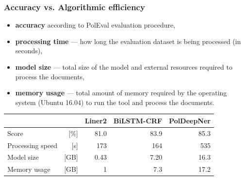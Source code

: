 \documentclass[Warsaw]{beamer}
\begin{document}

\begin{frame}
    \frametitle{Accuracy vs. Algorithmic efficiency}
    \begin{itemize}
        \item \textbf{accuracy} according to PolEval evaluation procedure, 
        \item \textbf{processing time} --- how long the evaluation dataset is being processed (in seconds), 
        \item \textbf{model size} --- total size of the model and external resources required to process the documents,
        \item \textbf{memory usage} --- total amount of memory required by the operating system (Ubuntu 16.04) to run the tool and process the documents.
    \end{itemize}
    
\begin{table}[ht]
\tiny
    \centering
    \bgroup
    \def\arraystretch{1.2}%
    \begin{tabular}{lr|r|r|r}
                         &     &  \textbf{Liner2} & \textbf{BiLSTM-CRF} & \textbf{PolDeepNer} \\
        \hline
        \hline
        Score                  & [\%] &  81.0   &  83.9 & 85.3 \\
        \hline
        Processing speed       & [s]  &  173    &  164  & 535 \\
        \hline
        Model size             & [GB] &  0.43  & 7.20  &  16.3 \\
        \hline
        Memory usage           & [GB] & 1       & 7.3   & 17.2 \\
    \end{tabular}
    \egroup
    \label{tab:comparision}
\end{table}    
\end{frame}
\end{document}
